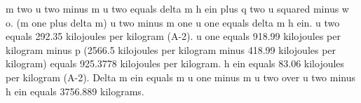 m two u two minus m u two equals delta m h ein plus q two u squared minus w o.  
(m one plus delta m) u two minus m one u one equals delta m h ein.  
u two equals 292.35 kilojoules per kilogram (A-2).  
u one equals 918.99 kilojoules per kilogram minus p (2566.5 kilojoules per kilogram minus 418.99 kilojoules per kilogram) equals 925.3778 kilojoules per kilogram.  
h ein equals 83.06 kilojoules per kilogram (A-2).  
Delta m ein equals m u one minus m u two over u two minus h ein equals 3756.889 kilograms.